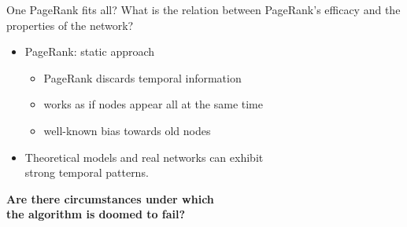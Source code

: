 \begin{frame}{One PageRank fits all?}
    What is the relation between PageRank's efficacy and the properties of the network?
    \begin{itemize}
        \item PageRank: \alert{static} approach
        \begin{itemize}
            \item PageRank discards temporal information
            \item works as if nodes appear all at the same time
            \item well-known bias towards old nodes
        \end{itemize}
        \item Theoretical models and real networks can exhibit \\ \alert{strong temporal patterns}.
    \end{itemize}
    \begin{center}
        \textbf{Are there circumstances under which \\ the algorithm is doomed to fail?}
    \end{center}
\end{frame}
